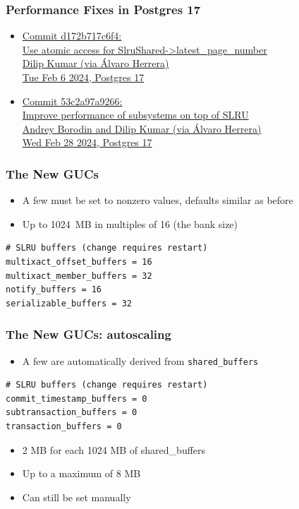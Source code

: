 \begin{frame}
  \frametitle{Performance Fixes in Postgres 17}
  \begin{itemize}
    \item {\linksize \href{https://git.postgresql.org/cgit/postgresql.git/commit/?id=d172b717c6f436738cc8383a4e9f611ae227fd93}
      {Commit d172b717c6f4: \faExternalLink \\
      Use atomic access for SlruShared->latest\_page\_number \\
      Dilip Kumar (via Álvaro Herrera) \\
      Tue Feb 6 2024, Postgres 17}}
      \vspace{0.2cm}
    \item {\linksize \href{https://git.postgresql.org/cgit/postgresql.git/commit/?id=53c2a97a92665be6bd7d70bd62ae6158fe4db96e}
      {Commit 53c2a97a9266: \faExternalLink \\
      Improve performance of subsystems on top of SLRU \\
      Andrey Borodin and Dilip Kumar (via Álvaro Herrera) \\
      Wed Feb 28 2024, Postgres 17}}
  \end{itemize}
\end{frame}

\begin{frame}[fragile]
  \frametitle{The New GUCs}
  \begin{itemize}
    \item A few must be set to nonzero values, defaults similar as before
    \item Up to 1024~MB in multiples of 16 (the bank size)
  \end{itemize}
  \begin{lstlisting}[frame=trBL,frameround=fttt]
# SLRU buffers (change requires restart)
multixact_offset_buffers = 16
multixact_member_buffers = 32
notify_buffers = 16
serializable_buffers = 32
  \end{lstlisting}  
\end{frame}

\begin{frame}[fragile]
  \frametitle{The New GUCs: autoscaling}
  \begin{itemize}
    \item A few are automatically derived from \texttt{shared\_buffers}
  \end{itemize}
  \begin{lstlisting}[frame=trBL,frameround=fttt]
# SLRU buffers (change requires restart)
commit_timestamp_buffers = 0
subtransaction_buffers = 0
transaction_buffers = 0
  \end{lstlisting}  
  \begin{itemize}
    \item 2 MB for each 1024 MB of shared\_buffers
    \item Up to a maximum of 8 MB
    \item Can still be set manually
  \end{itemize}
\end{frame}

